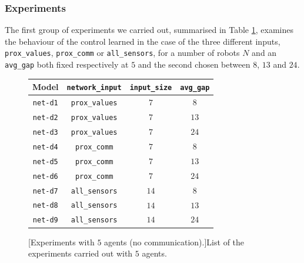 \subsubsection{Experiments}
\label{subsubsec:expdist}

The first group of experiments we carried out, summarised in Table 
\ref{tab:modeln5dist}, examines the behaviour of the control learned in the case 
of the three different inputs, \texttt{prox\_values}, \texttt{prox\_comm} or 
\texttt{all\_sensors}, for a number of robots $N$ and an \texttt{avg\_gap} both 
fixed respectively at $5$ and the second chosen between $8$, $13$ and $24$.
\begin{figure}[!htb]
	\centering
	\begin{tabular}{cccc}
		\toprule
		\textbf{Model} \quad & \textbf{\texttt{network\_input}} & 
		\textbf{\texttt{input\_size}} &
		\textbf{\texttt{avg\_gap}} \\
		\midrule
		\texttt{net-d1} 				 & \texttt{prox\_values}	&  $  7$  &  $  8$  \\
		\texttt{net-d2} 				& \texttt{prox\_values}	    &  $  7$  &  $13$ \\
		\texttt{net-d3} 				& \texttt{prox\_values}	    &  $  7$  &  $24$  \\
		\texttt{net-d4} 				 & \texttt{prox\_comm}	  &  $  7$  &  $  8$  \\
		\texttt{net-d5} 				 & \texttt{prox\_comm}	  &  $  7$  &  $13$  \\
		\texttt{net-d6} 				 & \texttt{prox\_comm}	  &  $  7$  &  $24$  \\
		\texttt{net-d7} 				 & \texttt{all\_sensors}	  &  $14$  &  $  8$  \\
		\texttt{net-d8} 				 & \texttt{all\_sensors}	  &  $14$  &  $13$ 	\\
		\texttt{net-d9} 				 & \texttt{all\_sensors}	  &  $14$  &  $24$ 	\\
		\bottomrule
	\end{tabular}
	[Experiments with $5$ agents (no communication).]{List of the 
	experiments carried out with $5$ agents.}
	\label{tab:modeln5dist}
\end{figure}

